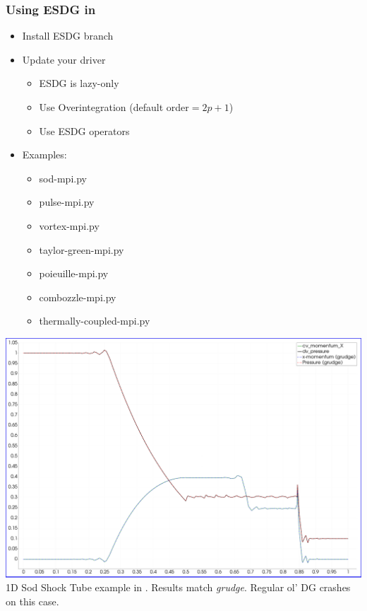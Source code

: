\begin{frame}
  \frametitle{Using ESDG in \mirgecom{}}
  \begin{minipage}[b]{0.48\textwidth}
    \begin{itemize}
      \item Install \mirgecom{} ESDG branch
      \item Update your driver
      \begin{itemize}
        \item ESDG is lazy-only
        \item Use Overintegration (default order$=2p+1$)
        \item Use ESDG operators
      \end{itemize}
      \item Examples:
      \begin{itemize}
        \item sod-mpi.py
        \item pulse-mpi.py
        \item vortex-mpi.py
        \item taylor-green-mpi.py
        \item poieuille-mpi.py
        \item combozzle-mpi.py
        \item thermally-coupled-mpi.py
      \end{itemize}
    \end{itemize}
  \end{minipage}\hfill
  \begin{minipage}[b]{0.48\textwidth}
    \centering
    \includegraphics[width=\textwidth]{figures/compare-sod-shock-esdg-grudge.png}
    \vspace{5pt} %
    \footnotesize 1D Sod Shock Tube example in \mirgecom{}. Results match \textit{grudge}. Regular ol' DG crashes on this case.
  \end{minipage}
\end{frame}

